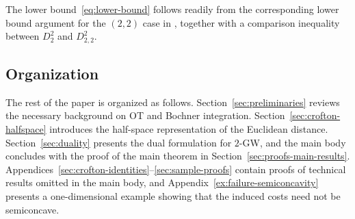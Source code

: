 \documentclass[11pt]{amsart}
\theoremstyle{definition}
\theoremstyle{remark}
\newcommand{\1}{\mathbf{1}}
\numberwithin{equation}{section}
\begin{document}
The lower bound~\eqref{eq:lower-bound} follows readily from the corresponding
lower bound argument for the $(2,2)$ case in
\cite[Theorem~4.2]{zhang2024gromov}, together with a comparison inequality
between $D_{2}^2$ and $D_{2,2}^2$. 


\subsection{Organization}
The rest of the paper is organized as follows. Section~\ref{sec:preliminaries} reviews the necessary background on OT and Bochner integration. Section~\ref{sec:crofton-halfspace} introduces the half-space representation of the Euclidean distance. Section~\ref{sec:duality} presents the dual formulation for $2$-GW, and the main body concludes with the proof of the main theorem in Section~\ref{sec:proofs-main-results}. Appendices~\ref{sec:crofton-identities}--\ref{sec:sample-proofs} contain proofs of technical results omitted in the main body, and Appendix~\ref{ex:failure-semiconcavity} presents a one-dimensional example showing that the induced costs need not be semiconcave.
\end{document}
